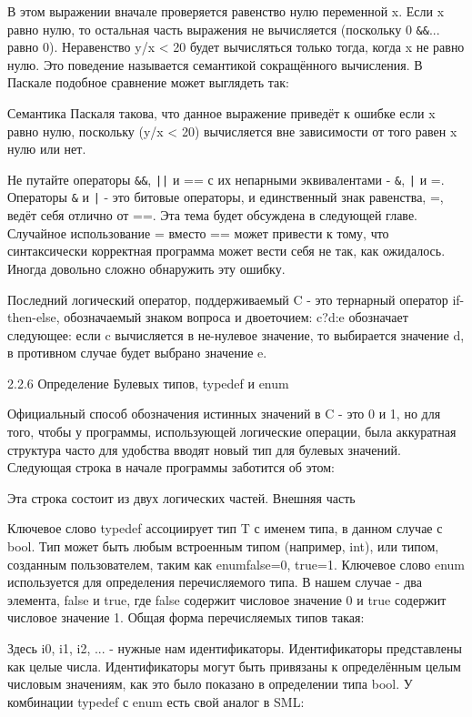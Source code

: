 В этом выражении вначале проверяется равенство нулю переменной x. Если x равно нулю, то остальная часть выражения не вычисляется (поскольку 0 \lstinline|&&|... равно 0). Неравенство y/x < 20 будет вычисляться только тогда, когда x не равно нулю. Это поведение называется семантикой сокращённого вычисления. В Паскале подобное сравнение может выглядеть так:

Семантика Паскаля такова, что данное выражение приведёт к ошибке если x равно нулю, поскольку (y/x < 20) вычисляется вне зависимости от того равен x нулю или нет.

Не путайте операторы \lstinline|&&|, \lstinline!||! и == с их непарными эквивалентами - \lstinline!&!, \lstinline!|! и =. Операторы \lstinline!&! и \lstinline!|! - это битовые операторы, и единственный знак равенства, =, ведёт себя отлично от ==. Эта тема будет обсуждена в следующей главе. Случайное использование = вместо == может привести к тому, что синтаксически корректная программа может вести себя не так, как ожидалось. Иногда довольно сложно обнаружить эту ошибку.

Последний логический оператор, поддерживаемый C - это тернарный оператор if-then-else, обозначаемый знаком вопроса и двоеточием: c?d:e обозначает следующее: если c вычисляется в не-нулевое значение, то выбирается значение d, в противном случае будет выбрано значение e.

2.2.6 Определение Булевых типов, typedef и enum

Официальный способ обозначения истинных значений в C - это 0 и 1, но для того, чтобы у программы, использующей логические операции, была аккуратная структура часто для удобства вводят новый тип для булевых значений. Следующая строка в начале программы заботится об этом:

Эта строка состоит из двух логических частей. Внешняя часть

Ключевое слово typedef ассоциирует тип T с именем типа, в данном случае с bool. Тип может быть любым встроенным типом (например, int), или типом, созданным пользователем, таким как enum{false=0, true=1}. Ключевое слово enum используется для определения перечисляемого типа. В нашем случае - два элемента, false и true, где false содержит числовое значение 0 и true содержит числовое значение 1. Общая форма перечисляемых типов такая:

Здесь i0, i1, i2, ... - нужные нам идентификаторы. Идентификаторы представлены как целые числа. Идентификаторы могут быть привязаны к определённым целым числовым значениям, как это было показано в определении типа bool. У комбинации typedef с enum есть свой аналог в SML:

